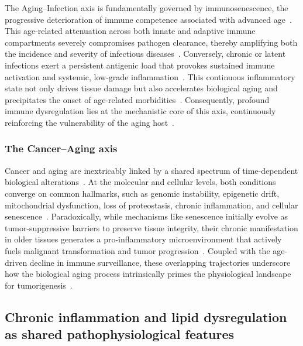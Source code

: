 The Aging--Infection axis is fundamentally governed by immunosenescence, the progressive deterioration of immune competence associated with advanced age~\cite{inflammaging}. This age-related attenuation across both innate and adaptive immune compartments severely compromises pathogen clearance, thereby amplifying both the incidence and severity of infectious diseases~\cite{NikolichZugich2018}. Conversely, chronic or latent infections exert a persistent antigenic load that provokes sustained immune activation and systemic, low-grade inflammation~\cite{inflammaging}. This continuous inflammatory state not only drives tissue damage but also accelerates biological aging and precipitates the onset of age-related morbidities~\cite{Muller2019}. Consequently, profound immune dysregulation lies at the mechanistic core of this axis, continuously reinforcing the vulnerability of the aging host~\cite{inflammaging}.

\subsubsection{The Cancer--Aging axis}

Cancer and aging are inextricably linked by a shared spectrum of time-dependent biological alterations~\cite{Aunan2017}. At the molecular and cellular levels, both conditions converge on common hallmarks, such as genomic instability, epigenetic drift, mitochondrial dysfunction, loss of proteostasis, chronic inflammation, and cellular senescence~\cite{LopezOtin2023}. Paradoxically, while mechanisms like senescence initially evolve as tumor-suppressive barriers to preserve tissue integrity, their chronic manifestation in older tissues generates a pro-inflammatory microenvironment that actively fuels malignant transformation and tumor progression~\cite{Campisi2013,Aunan2017}. Coupled with the age-driven decline in immune surveillance, these overlapping trajectories underscore how the biological aging process intrinsically primes the physiological landscape for tumorigenesis~\cite{Campisi2013}.






\subsection{Chronic inflammation and lipid dysregulation as shared pathophysiological features}

